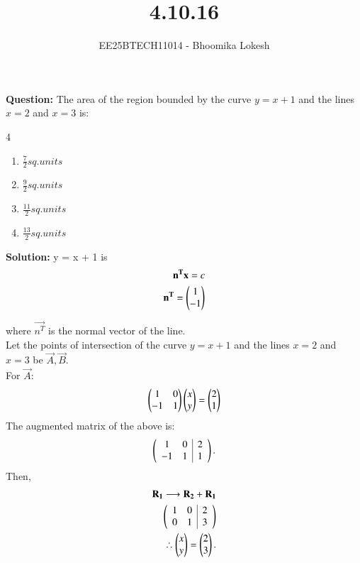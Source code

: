 \documentclass[journal,onecolumn]{IEEEtran}
\begin{document}

\vspace{3cm}

\title{4.10.16}
\author{EE25BTECH11014 - Bhoomika Lokesh}
{\let\newpage\relax\maketitle}

\renewcommand{\thefigure}{\theenumi}
\renewcommand{\thetable}{\theenumi}
\setlength{\intextsep}{10pt} %

\renewcommand{\thetable}{\theenumi}


\textbf{Question:} The area of the region bounded by the curve $y = x + 1$ 
and the lines $x=2$ and $x=3$ is:
\begin{multicols}{4}
\begin{enumerate}
    \item $\frac{7}{2} sq.units$
    \item $\frac{9}{2} sq.units$
    \item $\frac{11}{2} sq.units$
    \item $\frac{13}{2} sq.units$
\end{enumerate}
\end{multicols}
\textbf{Solution:}
y = x + 1 is
\begin{align}
 \mathbf{n^Tx}=c\\
\mathbf{n^T}=\begin{pmatrix}1\\-1\end{pmatrix}
\end{align}

where $\vec{n^T}$ is the normal vector of the line.\\
Let the points of intersection of the curve $y = x + 1$ and the lines $x=2$ and $x=3$ be
$\vec{A},\vec{B}.$\\
For $\vec{A}$:
\begin{align}
\begin{pmatrix}1 & 0 \\ 
-1 & 1\end{pmatrix}
\begin{pmatrix}x\\y\end{pmatrix}=\begin{pmatrix}2\\1\end{pmatrix}
\end{align}
The augmented matrix of the above is:
\begin{align}
\begin{pmatrix}\begin{array}{cc|c}
1 & 0 & 2 \\ 
-1 & 1 & 1
\end{array}\end{pmatrix}.
\end{align}
Then, 
\begin{align}
    \mathbf{R_1}\longrightarrow\mathbf{R_2}+\mathbf{R_1}\\
  \begin{pmatrix}\begin{array}{cc|c}
1 & 0 & 2 \\ 
0 & 1 & 3
\end{array}\end{pmatrix}\\
\therefore \begin{pmatrix}x\\y\end{pmatrix}=\begin{pmatrix}2\\3\end{pmatrix}.
\end{align}
\end{document}
